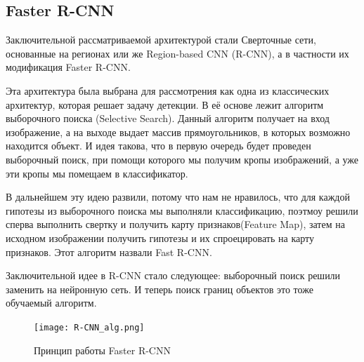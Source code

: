 \documentclass[../document.tex]{subfiles}
\begin{document}
	\subsection{Faster R-CNN}
		\par Заключительной рассматриваемой архитектурой стали Сверточные сети, основанные на регионах
 или же Region-based CNN (R-CNN), а в частности их модификация Faster R-CNN.
 		\par Эта архитектура была выбрана для рассмотрения как одна из классических архитектур, которая решает задачу детекции. В её основе лежит алгоритм выборочного поиска (Selective Search). Данный алгоритм получает на вход изображение, а на выходе выдает массив прямоугольников, в которых возможно находится объект. И идея такова, что в первую очередь будет проведен выборочный поиск, при помощи которого мы получим кропы изображений, а уже эти кропы мы помещаем в классификатор.
 		\par В дальнейшем эту идею развили, потому что нам не нравилось, что для каждой гипотезы из выборочного поиска мы выполняли классификацию, поэтмоу решили сперва выполнить свертку и получить карту признаков(Feature Map), затем на исходном изображении получить гипотезы и их спроецировать на карту признаков. Этот алгоритм назвали Fast R-CNN.
 		\par Заключительной идее в R-CNN стало следующее: выборочный поиск решили заменить на нейронную сеть. И теперь поиск границ объектов это тоже обучаемый алгоритм.
 		
 		\begin{figure}[H]
 			\centering
 			\texttt{[image: R-CNN\_alg.png]}
 			\caption{Принцип работы Faster R-CNN}
 		\end{figure}
 	
\end{document}
